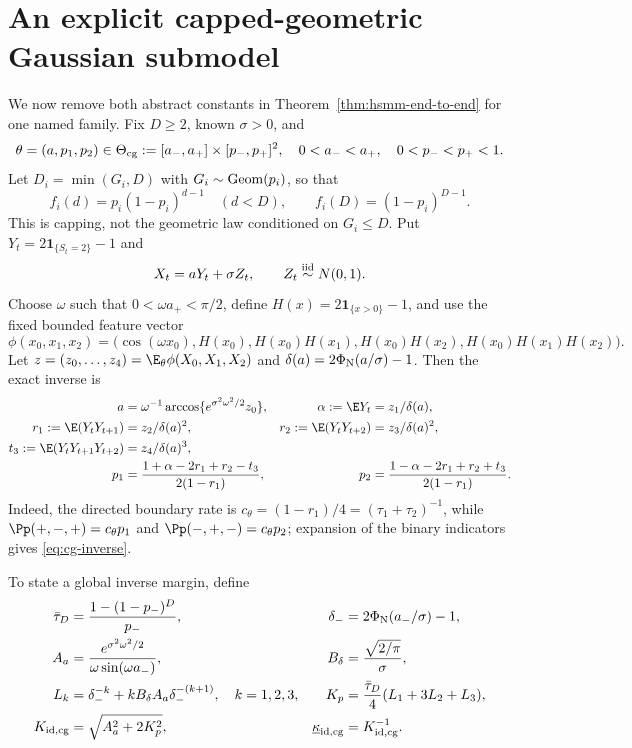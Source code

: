 \section{An explicit capped-geometric Gaussian submodel}
\label{sec:explicit-capped-gaussian}

We now remove both abstract constants in
Theorem~\ref{thm:hsmm-end-to-end} for one named family.  Fix $D\ge2$, known
$\sigma>0$, and
\[
 \theta=(a,p_1,p_2)\in
 \Theta_{\rm cg}:=[a_-,a_+]\times[p_-,p_+]^2,
 \quad 0<a_-<a_+,\quad0<p_-<p_+<1.
\]
Let $D_i=\min(G_i,D)$ with $G_i\sim{\rm Geom}(p_i)$, so that
\[
 f_i(d)=p_i(1-p_i)^{d-1}\quad(d<D),\qquad
 f_i(D)=(1-p_i)^{D-1}.
\]
This is capping, not the geometric law conditioned on $G_i\le D$.  Put
$Y_t=2\mathbf1_{\{S_t=2\}}-1$ and
\[
 X_t=aY_t+\sigma Z_t,\qquad Z_t\stackrel{\rm iid}{\sim}N(0,1).
\]
Choose $\omega$ such that $0<\omega a_+<\pi/2$, define
$H(x)=2\mathbf1_{\{x>0\}}-1$, and use the fixed bounded feature vector
\begin{equation}
 \phi(x_0,x_1,x_2)=
 \bigl(\cos(\omega x_0),H(x_0),H(x_0)H(x_1),
 H(x_0)H(x_2),H(x_0)H(x_1)H(x_2)\bigr).
 \label{eq:cg-feature}
\end{equation}
Let $z=(z_0,\ldots,z_4)=\E_\theta\phi(X_0,X_1,X_2)$ and
$\delta(a)=2\Phi_{\rm N}(a/\sigma)-1$.  Then the exact inverse is
\begin{align}
 a&=\omega^{-1}\arccos\{e^{\sigma^2\omega^2/2}z_0\},
 &\alpha:=\E Y_t&=z_1/\delta(a),\nonumber\\
 r_1:=\E(Y_tY_{t+1})&=z_2/\delta(a)^2,
 &r_2:=\E(Y_tY_{t+2})&=z_3/\delta(a)^2,\nonumber\\
 t_3:=\E(Y_tY_{t+1}Y_{t+2})&=z_4/\delta(a)^3,\nonumber\\
 p_1&=\frac{1+\alpha-2r_1+r_2-t_3}{2(1-r_1)},
 &p_2&=\frac{1-\alpha-2r_1+r_2+t_3}{2(1-r_1)}.
 \label{eq:cg-inverse}
\end{align}
Indeed, the directed boundary rate is
$c_\theta=(1-r_1)/4=(\tau_1+\tau_2)^{-1}$, while
$\Pp(+,-,+)=c_\theta p_1$ and
$\Pp(-,+,-)=c_\theta p_2$; expansion of the binary indicators gives
\eqref{eq:cg-inverse}.

To state a global inverse margin, define
\begin{align}
 \bar\tau_D&=\frac{1-(1-p_-)^D}{p_-},
 &\delta_-&=2\Phi_{\rm N}(a_-/\sigma)-1,\nonumber\\
 A_a&=\frac{e^{\sigma^2\omega^2/2}}
 {\omega\sin(\omega a_-)},
 &B_\delta&=\frac{\sqrt{2/\pi}}{\sigma},\nonumber\\
 L_k&=\delta_-^{-k}+kB_\delta A_a\delta_-^{-(k+1)},\quad k=1,2,3,
 &K_p&=\frac{\bar\tau_D}{4}(L_1+3L_2+L_3),\nonumber\\
 K_{\rm id,cg}&=\sqrt{A_a^2+2K_p^2},
 &\underline\kappa_{\rm id,cg}&=K_{\rm id,cg}^{-1}.
 \label{eq:cg-id-constants}
\end{align}

